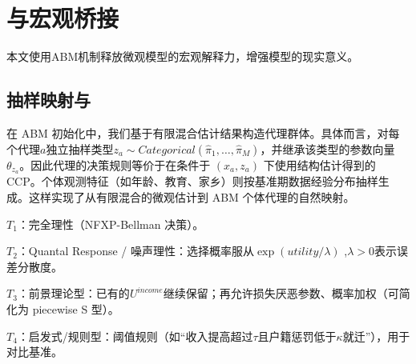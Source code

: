 \documentclass[
  a4paper,
  zihao=-4,
  fontset=mac,
  AutoFakeBold,
  AutoFakeSlant,
  oneside]{ctexbook}
\begin{document}






\chapter{与宏观桥接} %
\label{sec:与宏观桥接}

本文使用ABM机制释放微观模型的宏观解释力，增强模型的现实意义。


\section{抽样映射与} %
\label{sub:抽样映射与}


在 ABM 初始化中，我们基于有限混合估计结果构造代理群体。具体而言，对每个代理$a$独立抽样类型$z_a\sim Categorical(\hat \pi_1,\dots,\hat \pi_M)$，并继承该类型的参数向量 $\theta_{z_a}$。因此代理的决策规则等价于在条件于 $(x_a,z_a)$ 下使用结构估计得到的 CCP。个体观测特征（如年龄、教育、家乡）则按基准期数据经验分布抽样生成。这样实现了从有限混合的微观估计到 ABM 个体代理的自然映射。


$𝑇_1$：完全理性（NFXP-Bellman 决策）。

$𝑇_2$：Quantal Response / 噪声理性：选择概率服从$\exp(utility/\lambda)$ ,$\lambda>0$表示误差分散度。

$𝑇_3$：前景理论型：已有的$U^{income}$继续保留；再允许损失厌恶参数、概率加权（可简化为 piecewise S 型）。

$T_4$：启发式/规则型：阈值规则（如“收入提高超过$\tau$且户籍惩罚低于$\kappa$就迁”），用于对比基准。
\end{document}
